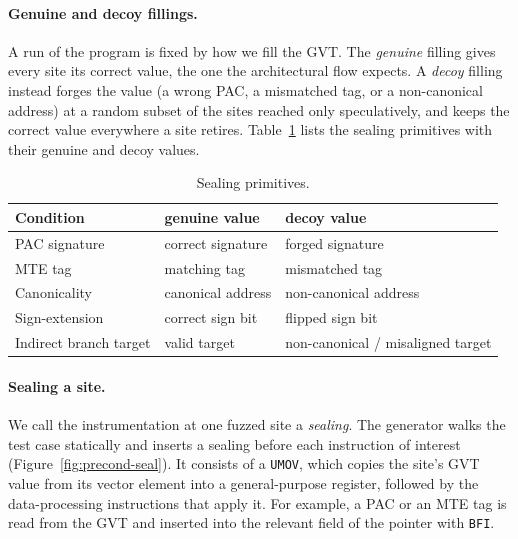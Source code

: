 \documentclass[letterpaper,twocolumn,10pt]{article}
\theoremstyle{definition}
\begin{document}
\paragraph{Genuine and decoy fillings.}
A run of the program is fixed by how we fill the GVT. The \emph{genuine} filling gives every site
its correct value, the one the architectural flow expects. A \emph{decoy} filling instead forges
the value (a wrong PAC, a mismatched tag, or a non-canonical address) at a random subset of the
sites reached only speculatively, and keeps the correct value everywhere a site retires.
Table~\ref{tab:sealings} lists the sealing primitives with their genuine and decoy values.

\begin{table}[t]
\centering
\footnotesize
\setlength{\tabcolsep}{4pt}
\caption{Sealing primitives.}
\label{tab:sealings}
\begin{tabular}{@{}l l l@{}}
\toprule
Condition & genuine value & decoy value \\
\midrule
PAC signature          & correct signature & forged signature \\
MTE tag                & matching tag      & mismatched tag \\
Canonicality           & canonical address & non-canonical address \\
Sign-extension         & correct sign bit  & flipped sign bit \\
Indirect branch target & valid target      & non-canonical / misaligned target \\
\bottomrule
\end{tabular}
\end{table}

\paragraph{Sealing a site.}
We call the instrumentation at one fuzzed site a \emph{sealing}. The generator walks the test
case statically and inserts a sealing before each instruction of interest
(Figure~\ref{fig:precond-seal}). It consists of a \texttt{UMOV}, which copies the site's GVT value
from its vector element into a general-purpose register, followed by the data-processing
instructions that apply it. For example, a PAC or an MTE tag is read from the GVT and inserted
into the relevant field of the pointer with \texttt{BFI}.
\end{document}
